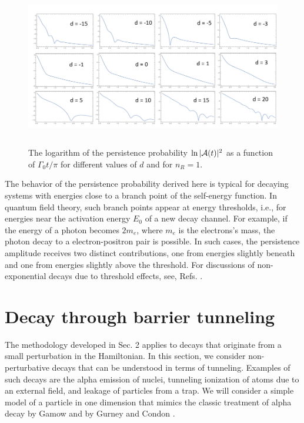 \documentclass[12pt]{article}
\numberwithin{equation}{section}
\begin{document}
\begin{figure}
\includegraphics[height=7cm]{persistence}
\caption{The logarithm of the persistence probability $\ln |{\cal A}(t)|^2$ as a function of $\Gamma_0t/\pi$ for different values of $d$ and for $n_R = 1$.   }
\end{figure}

The behavior of the persistence probability derived here is typical  for decaying systems with energies close to a branch point of the self-energy function. 
 In quantum field theory, such branch points appear at energy thresholds, i.e., for energies near  the activation energy $E_0$ of a new decay channel. For example, if the energy of a photon becomes $2m_e$, where $m_e$ is the electrons's mass, the photon decay to a electron-positron pair is possible. In such cases, the persistence amplitude receives two distinct contributions, one from energies slightly beneath and one from energies slightly above the threshold.  For discussions of non-exponential decays due to threshold effects, see, Refs. \cite{LZMM, RZ93, JMSST, DJN09}.



\section{Decay through barrier tunneling}
The methodology developed in Sec. 2 applies to decays that originate from a small perturbation in the Hamiltonian. In this section, we consider non-perturbative decays that can be understood in terms of tunneling. Examples of such decays are the alpha emission of nuclei, tunneling ionization of atoms due to an external field, and leakage of particles from a trap.
We will consider a simple model of a particle in one dimension that mimics the classic treatment of alpha decay by Gamow and by Gurney and Condon \cite{Gamow, GuCo}.
\end{document}
